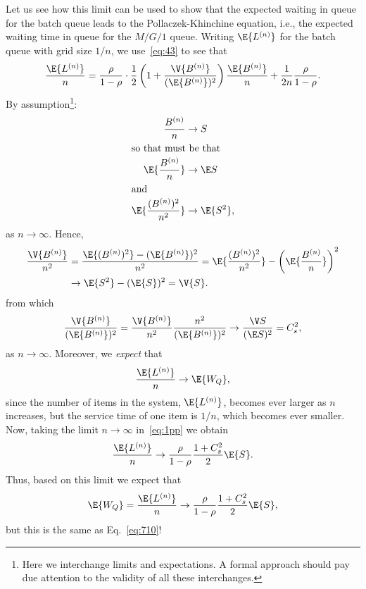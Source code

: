 Let us see how this limit can be used to show that the expected
waiting in queue for the batch queue leads to the
Pollaczek-Khinchine equation, i.e., the expected waiting time in
queue for the $M/G/1$ queue. Writing $\E{L^{(n)}}$ for the batch
queue with grid size $1/n$, we use~\cref{eq:43} to see that
\begin{align}\label{eq:1pp}
\frac{\E{L^{(n)}}}{n}
= \frac{\rho}{1-\rho}\cdot \frac12\left(1 + \frac{\V{B^{(n)}}}{(\E{B^{(n)}})^2}\right) \frac{\E{B^{(n)}}}n + \frac1{2n}\frac{\rho}{1-\rho}.
\end{align}
By assumption\footnote{ Here we interchange limits and expectations. A
 formal approach should pay due attention to the validity of all
 these interchanges.}:
\begin{align*}
\frac{B^{(n)}}n &\to S \\
\intertext{so that must be that
}
\E{\frac{B^{(n)}}n} &\to \E S \\
\intertext{and}
\E{\frac{(B^{(n)})^2}{n^2}} &\to \E{S^2},
\end{align*}
as $n\to \infty$. 
Hence, 
\begin{equation*}
 \begin{split}
\frac{\V{B^{(n)}}}{n^2} 
&= 
\frac{\E{(B^{(n)})^2} - (\E{B^{(n)}})^2}{n^2} = 
\E{\frac{(B^{(n)})^2}{n^2}} - \left(\E{\frac{B^{(n)}}{n}}\right)^2 \\
&\to \E{S^2} - (\E{S})^2 = \V{S}.
 \end{split}
\end{equation*}
from which
\begin{equation*}
\frac{\V{B^{(n)}}} {(\E{B^{(n)}})^2} = \frac{\V{B^{(n)}}}{n^2}\frac{n^2}{(\E{B^{(n)}})^2} \to 
\frac{\V S}{(\E S)^2} = C_s^2,
\end{equation*}
as $n\to \infty$. Moreover, we \emph{expect} that
\begin{equation*}
\frac{\E{L^{(n)}}}n \to \E{W_Q},
\end{equation*}
since the number of items in the system, $\E{L^{(n)}}$, becomes ever
larger as $n$ increases, but the service time of one item is $1/n$,
which becomes ever smaller. Now, taking the limit $n\to\infty$
in~\cref{eq:1pp} we obtain
\begin{equation*}
 \frac{\E{L^{(n)}}}{n}
 \to \frac{\rho}{1-\rho} \frac{1 + C_s^2}2\E{S}.
\end{equation*}
Thus, based on this limit we expect that 
\begin{equation*}
\E{W_Q}= \frac{\E{L^{(n)}}}{n}
 \to \frac{\rho}{1-\rho} \frac{1 + C_s^2}2\E{S},
\end{equation*}
but this is the same as Eq.~\cref{eq:710}!

